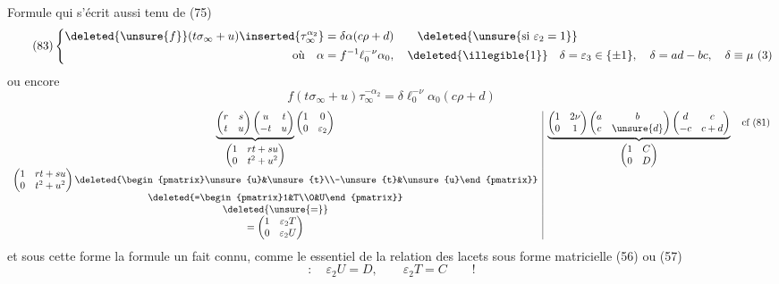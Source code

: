 Formule qui s'écrit aussi
   tenu de (75)
\[
\tag{83}
\left\{\begin{aligned}
\deleted{\unsure{f}}(t\sigma_\infty+u)\inserted{\tau_\infty^{\alpha_2}}
&=\delta\alpha(c\rho+d)
\qquad\deleted{\unsure{\text{si }\varepsilon_2=1}}\\
\text{où}\quad\alpha&=f^{-1}\ell_0^{-\nu}\alpha_0,
\quad\deleted{\illegible{1}}\quad
\delta=\varepsilon_3\in\{\pm1\},\quad\delta=ad-bc,\quad\delta\equiv\mu\ (3)
\end{aligned}\right.
\]
ou encore
\[
\tag{84}
f(t\sigma_\infty+u)\tau_\infty^{-\alpha_2}
=\delta\ell_0^{-\nu}\alpha_0(c\rho+d)
\]
\[
\begin{array}{c|c}
\underbrace{
\begin{pmatrix}r&s\\t&u\end{pmatrix}
\begin{pmatrix}u&t\\-t&u\end{pmatrix}
}_{\displaystyle\begin{pmatrix}1&rt+su\\0&t^2+u^2\end{pmatrix}}
\begin{pmatrix}1&0\\0&\varepsilon_2\end{pmatrix}
&
\underbrace{
\begin{pmatrix}1&2\nu\\0&1\end{pmatrix}
\begin{pmatrix}a&b\\c&\unsure{d}\end{pmatrix}
\begin{pmatrix}d&c\\-c&c+d\end{pmatrix}
}_{\displaystyle\begin{pmatrix}1&C\\0&D\end{pmatrix}}
\quad\text{cf (81)}\\
\begin{pmatrix}1&rt+su\\0&t^2+u^2\end{pmatrix}\deleted{\begin{pmatrix}\unsure{u}&\unsure{t}\\-\unsure{t}&\unsure{u}\end{pmatrix}}&\\
\deleted{=\begin{pmatrix}1&T\\0&U\end{pmatrix}}&\\
\deleted{\unsure{=}}&\\
=\begin{pmatrix}1&\varepsilon_2T\\0&\varepsilon_2U\end{pmatrix}&
\end{array}
\]
et sous cette forme la formule  un fait connu,
comme le  essentiel de la  relation des lacets sous forme matricielle (56) ou (57)
\[
:\quad\varepsilon_2U=D,\qquad\varepsilon_2T=C\qquad!
\]

